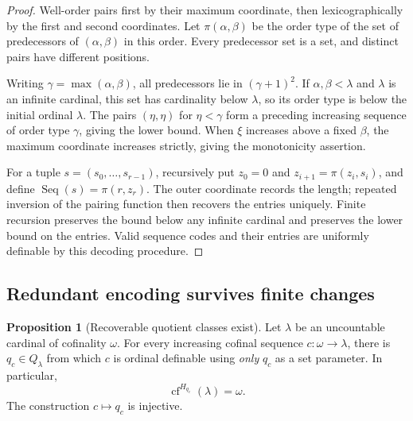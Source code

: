 \documentclass[11pt,letterpaper]{article}
\theoremstyle{definition}
\newtheorem{proposition}[definition]{Proposition}
\numberwithin{equation}{section}
\newcommand{\cf}{\operatorname{cf}}
\newcommand{\Qlam}{Q_\lambda}
\newcommand{\Seq}{\operatorname{Seq}}
\newcommand{\GPair}{\pi}
\begin{document}
\begin{proof}
Well-order pairs first by their maximum coordinate, then lexicographically by the first and second coordinates. Let $\GPair(\alpha,\beta)$ be the order type of the set of predecessors of $(\alpha,\beta)$ in this order. Every predecessor set is a set, and distinct pairs have different positions.

Writing $\gamma=\max(\alpha,\beta)$, all predecessors lie in $(\gamma+1)^2$. If $\alpha,\beta<\lambda$ and $\lambda$ is an infinite cardinal, this set has cardinality below $\lambda$, so its order type is below the initial ordinal $\lambda$. The pairs $(\eta,\eta)$ for $\eta<\gamma$ form a preceding increasing sequence of order type $\gamma$, giving the lower bound. When $\xi$ increases above a fixed $\beta$, the maximum coordinate increases strictly, giving the monotonicity assertion.

For a tuple $s=(s_0,\ldots,s_{r-1})$, recursively put $z_0=0$ and $z_{i+1}=\GPair(z_i,s_i)$, and define $\Seq(s)=\GPair(r,z_r)$. The outer coordinate records the length; repeated inversion of the pairing function then recovers the entries uniquely. Finite recursion preserves the bound below any infinite cardinal and preserves the lower bound on the entries. Valid sequence codes and their entries are uniformly definable by this decoding procedure.
\end{proof}

\subsection{Redundant encoding survives finite changes}

\begin{proposition}[Recoverable quotient classes exist]\label{prop:recovery}
Let $\lambda$ be an uncountable cardinal of cofinality $\omega$. For every increasing cofinal sequence $c:\omega\to\lambda$, there is $q_c\in\Qlam$ from which $c$ is ordinal definable using \emph{only} $q_c$ as a set parameter. In particular,
\[
\cf^{H_{q_c}}(\lambda)=\omega.
\]
The construction $c\mapsto q_c$ is injective.
\end{proposition}
\end{document}
